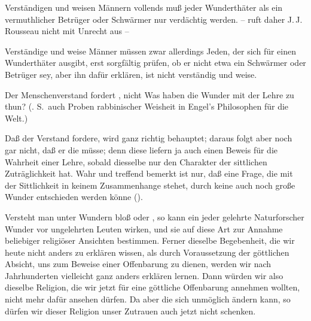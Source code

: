  Verständigen und weisen Männern vollends muß jeder Wunderthäter als ein vermuthlicher Betrüger oder Schwärmer nur verdächtig werden.  -- ruft daher J.\,J.\,Rousseau nicht mit Unrecht aus -- \par 
{} Verständige und weise Männer müssen zwar allerdings Jeden, der sich für einen Wunderthäter ausgibt, erst sorgfältig prüfen, ob er nicht etwa ein Schwärmer oder Betrüger sey, aber ihn  dafür erklären, ist nicht verständig und weise.\par
{} Der Menschenverstand fordert , nicht  Was haben die Wunder mit der Lehre zu thun? (. S.~auch Proben rabbinischer Weisheit in Engel's Philosophen für die Welt.)\par
{} Daß der Verstand  fordere, wird ganz richtig behauptet; daraus folgt aber noch gar nicht, daß er die  müsse; denn diese liefern ja auch einen Beweis für die Wahrheit einer Lehre, sobald diesselbe nur den Charakter der sittlichen Zuträglichkeit hat. Wahr und treffend bemerkt ist nur, daß eine Frage, die mit der Sittlichkeit in keinem Zusammenhange stehet, durch keine auch noch  große Wunder entschieden werden könne ().~\par
{} Versteht man unter Wundern bloß  oder , so kann ein jeder gelehrte Naturforscher Wunder vor ungelehrten Leuten wirken, und sie auf diese Art zur Annahme beliebiger religiöser Ansichten bestimmen. Ferner dieselbe Begebenheit, die wir heute nicht anders zu erklären wissen, als durch Voraussetzung der göttlichen Absicht, uns zum Beweise einer Offenbarung zu dienen, werden wir nach Jahrhunderten vielleicht ganz anders erklären lernen. Dann würden wir also dieselbe Religion, die wir jetzt für eine göttliche Offenbarung annehmen wollten, nicht mehr dafür ansehen dürfen. Da aber die  sich unmöglich ändern kann, so dürfen wir dieser Religion unser Zutrauen auch jetzt nicht schenken.\par
